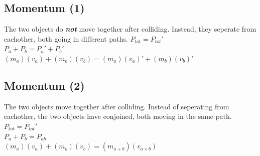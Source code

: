 \documentclass{article}
\begin{document}
\begin{adjustwidth}{1cm}{0pt}
    \subsection{Momentum (1)}
    \begin{flushleft}
        The two objects do \textbf{\textit{not}} move together after colliding. Instead, they seperate from eachother, both going in different paths.\newline\newline
        $P_{tot} = P_{tot}\prime$ \\
        \vspace*{10pt}
        $P_{a} + P_{b} = P_{a}\prime + P_{b}\prime$ \\
        \vspace*{10pt}
        $(m_{a})(v_{a}) + (m_{b})(v_{b}) = (m_{a})(v_{a})\prime + (m_{b})(v_{b})\prime$
    \end{flushleft}
    \vspace*{0.03cm}
    \subsection{Momentum (2)}
    \begin{flushleft}
        The two objects move together after colliding. Instead of seperating from eachother, the two objects have conjoined, both moving in the same path.\newline\newline
        $P_{tot} = P_{tot}\prime$ \\
        \vspace*{10pt}
        $P_{a} + P_{b} = P_{ab}$ \\
        \vspace*{10pt}
        $(m_{a})(v_{a}) + (m_{b})(v_{b}) = (m_{a + b})(v_{a\times b})$
    \end{flushleft}
\end{adjustwidth}
\end{document}
